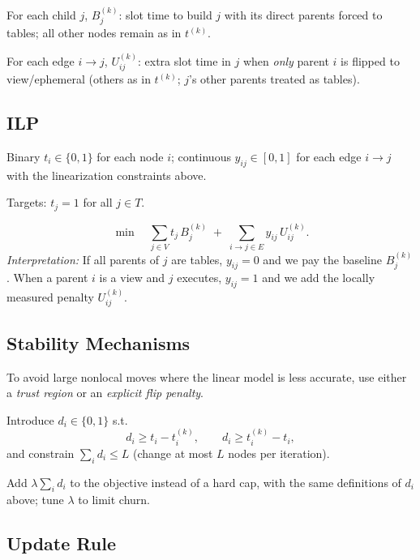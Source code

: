 
 For each child $j$, $B_j^{(k)}$: slot time to build $j$ with its direct parents forced to tables; all other nodes remain as in $t^{(k)}$.


 For each edge $i \rightarrow j$, $U_{ij}^{(k)}$: extra slot time in $j$ when \emph{only} parent $i$ is flipped to view/ephemeral (others as in $t^{(k)}$; $j$’s other parents treated as tables).




\subsection{ILP}

Binary $t_i\in\{0,1\}$ for each node $i$; continuous $y_{ij}\in[0,1]$ for each edge $i \rightarrow j$ with the linearization constraints above.

Targets: $t_j=1$ for all $j\in T$.

\[
\min \quad \sum_{j\in V} t_j\, B_j^{(k)} \;+\; \sum_{i \rightarrow j \in E} y_{ij}\, U_{ij}^{(k)}.
\]
\emph{Interpretation:} If all parents of $j$ are tables, $y_{ij}=0$ and we pay the baseline $B_j^{(k)}$.  
When a parent $i$ is a view and $j$ executes, $y_{ij}=1$ and we add the locally measured penalty $U_{ij}^{(k)}$.

\subsection{Stability Mechanisms}

To avoid large nonlocal moves where the linear model is less accurate, use either a
\emph{trust region} or an \emph{explicit flip penalty}.

Introduce $d_i\in\{0,1\}$ s.t.
\[
d_i \ge t_i - t_i^{(k)},\qquad d_i \ge t_i^{(k)} - t_i,
\]
and constrain $\sum_i d_i \le L$ (change at most $L$ nodes per iteration).

Add $\lambda \sum_i d_i$ to the objective instead of a hard cap, with the same
definitions of $d_i$ above; tune $\lambda$ to limit churn.

\subsection{Update Rule}

